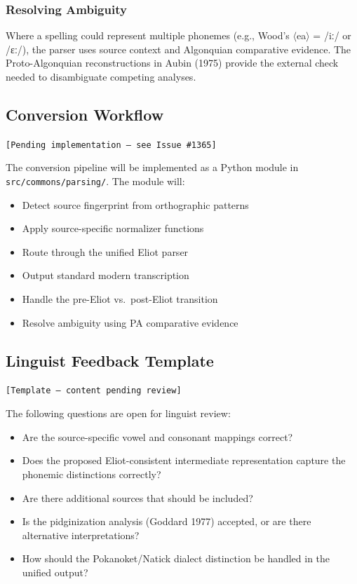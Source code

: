 \subsubsection{Resolving Ambiguity}

Where a spelling could represent multiple phonemes (e.g., Wood's $\langle$ea$\rangle$
= /iː/ or /ɛː/), the parser uses source context and Algonquian comparative
evidence. The Proto-Algonquian reconstructions in Aubin (1975) provide the
external check needed to disambiguate competing analyses.

\subsection{Conversion Workflow}
\texttt{[Pending implementation --- see Issue \#1365]}

The conversion pipeline will be implemented as a Python module in
\texttt{src/commons/parsing/}. The module will:

\begin{itemize}
  \item Detect source fingerprint from orthographic patterns
  \item Apply source-specific normalizer functions
  \item Route through the unified Eliot parser
  \item Output standard modern transcription
  \item Handle the pre-Eliot vs.\ post-Eliot transition
  \item Resolve ambiguity using PA comparative evidence
\end{itemize}

\subsection{Linguist Feedback Template}

\texttt{[Template --- content pending review]}

The following questions are open for linguist review:

\begin{itemize}
  \item Are the source-specific vowel and consonant mappings correct?
  \item Does the proposed Eliot-consistent intermediate representation capture
    the phonemic distinctions correctly?
  \item Are there additional sources that should be included?
  \item Is the pidginization analysis (Goddard 1977) accepted, or are there
    alternative interpretations?
  \item How should the Pokanoket/Natick dialect distinction be handled in the
    unified output?
\end{itemize}

